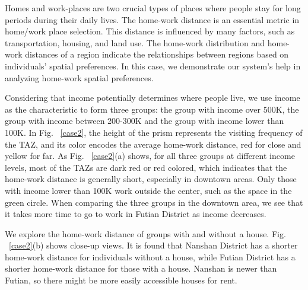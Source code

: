 \documentclass{ieeeaccess}
\begin{document}
Homes and work-places are two crucial types of places where people stay for long periods during their daily lives. The home-work distance is an essential metric in home/work place selection. This distance is influenced by many factors, such as transportation, housing, and land use. The home-work distribution and home-work distances of a region indicate the relationships between regions based on individuals' spatial preferences. In this case, we demonstrate our system's help in analyzing home-work spatial preferences.

Considering that income potentially determines where people live, we use income as the characteristic to form three groups: the group with income over 500K, the group with income between 200-300K and the group with income lower than 100K. In Fig. ~\ref{case2}, the height of the prism represents the visiting frequency of the TAZ, and its color encodes the average home-work distance, red for close and yellow for far. As Fig. ~\ref{case2}(a) shows, for all three groups at different income levels, most of the TAZs are dark red or red colored, which indicates that the home-work distance is generally short, especially in downtown areas. Only those with income lower than 100K work outside the center, such as the space in the green circle. When comparing the three groups in the downtown area, we see that it takes more time to go to work in Futian District as income decreases.

We explore the home-work distance of groups with and without a house. Fig. ~\ref{case2}(b) shows close-up views. It is found that Nanshan District has a shorter home-work distance for individuals without a house, while Futian District has a shorter home-work distance for those with a house. Nanshan is newer than Futian, so there might be more easily accessible houses for rent.
\end{document}
